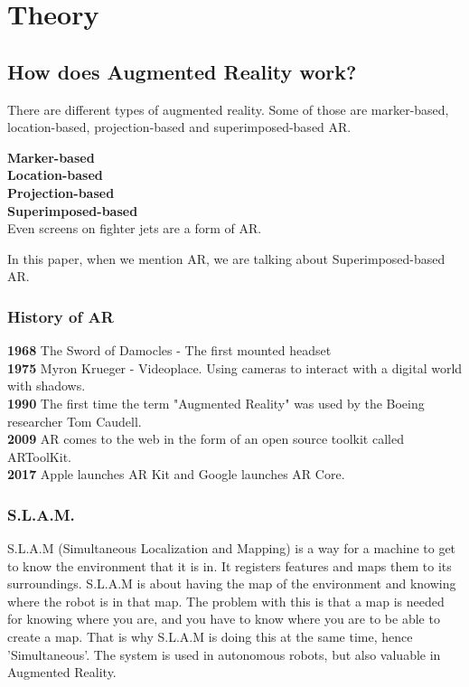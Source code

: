 \section{Theory}

\subsection{How does Augmented Reality work?}
There are different types of augmented reality. Some of those are marker-based, location-based, projection-based and superimposed-based AR.

\textbf{Marker-based}\\

\textbf{Location-based}\\

\textbf{Projection-based}\\

\textbf{Superimposed-based}\\

Even screens on fighter jets are a form of AR.

In this paper, when we mention AR, we are talking about Superimposed-based AR.

\subsubsection{History of AR}

\textbf{1968}
The Sword of Damocles - The first mounted headset\\

\textbf{1975}
Myron Krueger - Videoplace. Using cameras to interact with a digital world with shadows.
\cite{videoplace}\\

\textbf{1990}
The first time the term "Augmented Reality" was used by the Boeing researcher Tom Caudell.\\

\textbf{2009}
AR comes to the web in the form of an open source toolkit called ARToolKit.\\

\textbf{2017}
Apple launches AR Kit and Google launches AR Core.\\

\subsubsection{S.L.A.M.}
S.L.A.M (Simultaneous Localization and Mapping) is a way for a machine to get to know the environment that it is in. It registers features and maps them to its surroundings. S.L.A.M is about having the map of the environment and knowing where the robot is in that map.
The problem with this is that a map is needed for knowing where you are, and you have to know where you are to be able to create a map. That is why S.L.A.M is doing this at the same time, hence 'Simultaneous'. The system is used in autonomous robots, but also valuable in Augmented Reality. \cite{slam}


